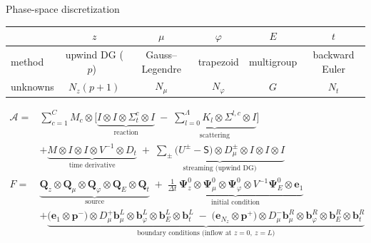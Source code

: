 \documentclass[aspectratio=169,11pt]{beamer}
\newcommand{\kron}{\otimes}
\newcommand{\pp}{{\bm p^{+}}}
\newcommand{\pmn}{{\bm p^{-}}}
\begin{document}
\begin{frame}{Phase-space discretization}
\centering
\footnotesize
\renewcommand{\arraystretch}{1.1}
\begin{tabular}{@{}lccccc@{}}
\toprule
 & $z$ & $\mu$ & $\varphi$ & $E$ & $t$\\
\midrule
method & upwind DG ($p$)~\cite{ReedHill} & Gauss--Legendre & trapezoid & multigroup & backward Euler\\
unknowns & $N_z(p+1)$ & $N_\mu$ & $N_\varphi$ & $G$ & $N_t$\\
\bottomrule
\end{tabular}
\vspace{0.8ex}

\raggedright
\footnotesize
\begin{align*}
\mathcal A={}&\sum\nolimits_{c=1}^{C}M_c\kron\Big[\underbrace{I\kron I\kron\Sigma^c_t\kron I}_{\text{reaction}}
\;-\;\underbrace{\sum\nolimits_{l=0}^{\Lambda}K_l\kron\Sigma^{l,c}\kron I}_{\text{scattering}}\Big]
\\[-1ex]
&+\underbrace{M\kron I\kron I\kron V^{-1}\kron D_t}_{\text{time derivative}}
\;+\;\underbrace{\sum\nolimits_{\pm}\big(U^{\pm}-\mathsf S\big)\kron D^{\pm}_\mu\kron I\kron I\kron I}_{\text{streaming (upwind DG)}}\\[-0.3ex]
F={}&\underbrace{\bm Q_z\kron\bm Q_\mu\kron\bm Q_\varphi\kron\bm Q_E\kron\bm Q_t}_{\text{source}}
\;+\;\underbrace{\tfrac{1}{\Delta t}\,\bm\Psi^0_z\kron\bm\Psi^0_\mu\kron\bm\Psi^0_\varphi\kron V^{-1}\bm\Psi^0_E\kron\bm e_1}_{\text{initial condition}}\\[-1ex]
&+\underbrace{\big(\bm e_1\kron\pmn\big)\kron D^{+}_\mu\bm b^{L}_\mu\kron\bm b^{L}_\varphi\kron\bm b^{L}_E\kron\bm b^{L}_t
\;-\;\big(\bm e_{N_z}\kron\pp\big)\kron D^{-}_\mu\bm b^{R}_\mu\kron\bm b^{R}_\varphi\kron\bm b^{R}_E\kron\bm b^{R}_t}_{\text{boundary conditions (inflow at }z=0,\ z=L)}
\end{align*}
\end{frame}
\end{document}
